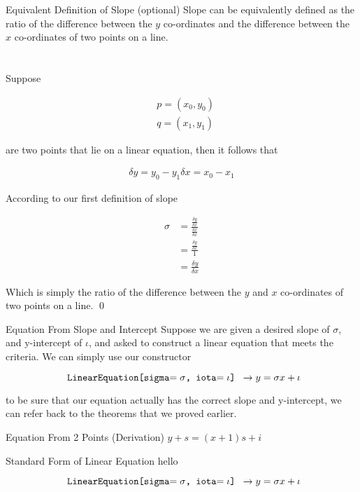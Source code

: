 \documentclass{book}
\begin{document}
  {\theorem Equivalent Definition of Slope (optional)  
    Slope can be equivalently defined as the ratio of the difference between the $y$ co-ordinates and the difference between the $x$ co-ordinates of two points on a line.\\\\

    \proof\\
    Suppose

    \begin{align*}
      & p = (x_0, y_0)\\
      & q = (x_1, y_1)
    \end{align*}

    are two points that lie on a linear equation, then it follows that

    \begin{align*}
      \delta y = y_0 - y_1
      \delta x = x_0 - x_1
    \end{align*}

    According to our first definition of slope

    \begin{align*}
      \sigma & = \frac{\frac{\delta y}{\delta x}}{\frac{\delta x}{\delta x}}\\
      & = \frac{\frac{\delta y}{\delta x}}{1}\\
      & = \frac{\delta y}{\delta x}
    \end{align*}

    Which is simply the ratio of the difference between the $y$ and $x$ co-ordinates of two points on a line. \qed
  }


  {\remark Equation From Slope and Intercept
    Suppose we are given a desired slope of $\sigma$, and y-intercept of $\iota$, and asked to construct a linear equation that meets the criteria. We can simply use our constructor

    $$\text{\texttt{ LinearEquation[sigma$= {\sigma}$, iota$= {\iota}$] }}\to y = {\sigma}x + {\iota}$$

    to be sure that our equation actually has the correct slope and y-intercept, we can refer back to the theorems that we proved earlier.
  }

  {\remark Equation From 2 Points (Derivation) 
    $y + s = (x + 1)s + i$
  }

  {\remark Standard Form of Linear Equation 
    hello

    $$\text{\texttt{ LinearEquation[sigma$= {\sigma}$, iota$= {\iota}$] }}\to y = {\sigma}x + {\iota}$$
  }
\end{document}
